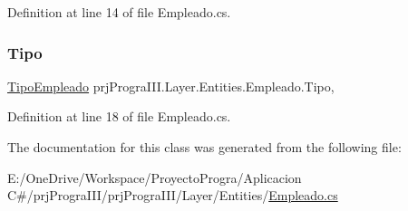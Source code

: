 Definition at line 14 of file Empleado.\+cs.

\hypertarget{classprj_progra_i_i_i_1_1_layer_1_1_entities_1_1_empleado_a3554c50c15132769e530ebe4ee42a2ac}{}\label{classprj_progra_i_i_i_1_1_layer_1_1_entities_1_1_empleado_a3554c50c15132769e530ebe4ee42a2ac} 
\subsubsection{\texorpdfstring{Tipo}{Tipo}}
{\footnotesize\ttfamily \hyperlink{_tipo_empleado_8cs_a13ab6a6d206b912e5c08708cdf950169}{Tipo\+Empleado} prj\+Progra\+I\+I\+I.\+Layer.\+Entities.\+Empleado.\+Tipo\hspace{0.3cm}{\ttfamily [get]}, {\ttfamily [set]}}



Definition at line 18 of file Empleado.\+cs.



The documentation for this class was generated from the following file\+:\begin{DoxyCompactItemize}
\item 
E\+:/\+One\+Drive/\+Workspace/\+Proyecto\+Progra/\+Aplicacion C\#/prj\+Progra\+I\+I\+I/prj\+Progra\+I\+I\+I/\+Layer/\+Entities/\hyperlink{_empleado_8cs}{Empleado.\+cs}\end{DoxyCompactItemize}
